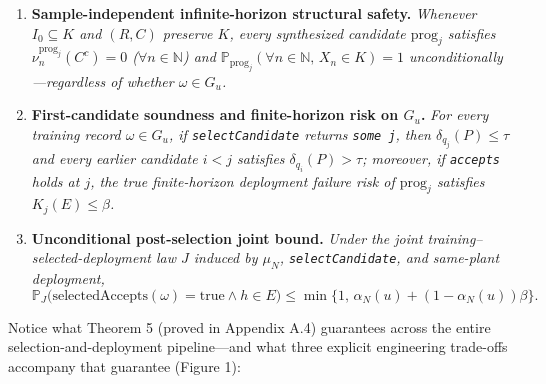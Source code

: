 \documentclass[11pt,a4paper]{article}
\providecommand{\tightlist}{\setlength{\itemsep}{2pt}\setlength{\parskip}{0pt}}
\begin{document}
\begin{enumerate}
\def\labelenumi{\arabic{enumi}.}
\tightlist
\item
  \textbf{Sample-independent infinite-horizon structural safety.}
  \emph{Whenever \(I_0 \subseteq K\) and \((R, C)\) preserve \(K\),
  every synthesized candidate \(\mathrm{prog}_j\) satisfies
  \(\nu_n^{\mathrm{prog}_j}(C^c) = 0\) (\(\forall n \in \mathbb{N}\))
  and
  \(\mathbb{P}_{\mathrm{prog}_j}(\forall n \in \mathbb{N},\, X_n \in K) = 1\)
  unconditionally---regardless of whether \(\omega \in G_u\).}
\item
  \textbf{First-candidate soundness and finite-horizon risk on \(G_u\).}
  \emph{For every training record \(\omega \in G_u\), if
  \texttt{selectCandidate} returns \texttt{some\ j}, then
  \(\delta_{q_j}(P) \le \tau\) and every earlier candidate \(i < j\)
  satisfies \(\delta_{q_i}(P) > \tau\); moreover, if \texttt{accepts}
  holds at \(j\), the true finite-horizon deployment failure risk of
  \(\mathrm{prog}_j\) satisfies \(K_j(E) \le \beta\).}
\item
  \textbf{Unconditional post-selection joint bound.} \emph{Under the
  joint training--selected-deployment law \(J\) induced by \(\mu_N\),
  \texttt{selectCandidate}, and same-plant deployment,}
  \[\mathbb{P}_J\bigl(\mathrm{selectedAccepts}(\omega) = \mathrm{true} \land h \in E\bigr)
  \le \min\bigl\{1,\, \alpha_N(u) + (1 - \alpha_N(u))\beta\bigr\}.\]
\end{enumerate}

Notice what Theorem 5 (proved in Appendix A.4) guarantees across the
entire selection-and-deployment pipeline---and what three explicit
engineering trade-offs accompany that guarantee (Figure 1):
\end{document}
